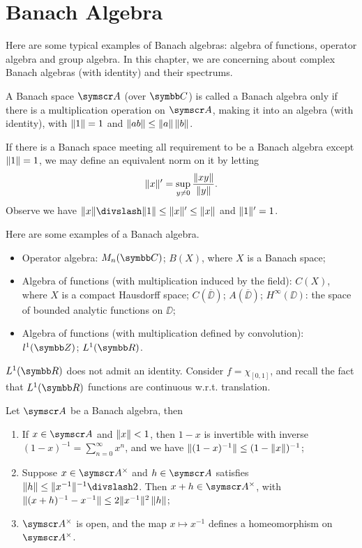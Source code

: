 
\chapter{Banach Algebra}

Here are some typical examples of Banach algebras: algebra of functions, operator algebra and group algebra. In this chapter, we are concerning about complex Banach algebras (with identity) and their spectrums.

\begin{definition}
  A Banach space $\BA{A}$ (over $\CC$) is called a Banach algebra only if there is a multiplication operation on $\BA{A}$, making it into an algebra (with identity), with $\Vert1\Vert=1$ and $\Vert ab\Vert\leq \Vert a\Vert\,\Vert b\Vert$.
\end{definition}

If there is a Banach space meeting all requirement to be a Banach algebra except $\Vert1\Vert=1$, we may define an equivalent norm on it by letting
\begin{equation*}
  \Vert x\Vert'=\sup_{y\neq 0}\frac{\Vert xy\Vert}{\Vert y\Vert}.
\end{equation*}
Observe we have $\NORM{x}\DIV\NORM{1}\leq\NORM{x}'\leq\NORM{x}$ and $\Vert1\Vert'=1$.

Here are some examples of a Banach algebra.

\begin{itemize}
  \item Operator algebra: $M_n(\CC)$; $B(X)$, where $X$ is a Banach space;
  \item Algebra of functions (with multiplication induced by the field): $C(X)$, where $X$ is a compact Hausdorff space; $C(\overline\DD)$; $A(\overline\DD)$; $H^{\infty}(\DD)$: the space of bounded analytic functions on $\DD$;
  \item Algebra of functions (with multiplication defined by convolution): $l^1(\ZZ)$; $L^1(\RR)$.
\end{itemize}

\begin{example}
  $L^1(\RR)$ does not admit an identity. Consider $f = \chi_{[0, 1]}$, and recall the fact that $L^1(\RR)$ functions are continuous w.r.t. translation.
\end{example}

\begin{proposition}
  Let $\BA{A}$ be a Banach algebra, then
  \begin{enumerate}[label=(\arabic*)]
    \item If $x\in \BA{A}$ and $\Vert x\Vert<1$, then $1-x$ is invertible with inverse $(1-x)^{-1}=\sum_{n=0}^\infty x^n$, and we have $\Vert(1-x)^{-1}\Vert\leq (1-\Vert x\Vert)^{-1}$;
    \item Suppose $x\in \BA{A}^\times$ and $h\in \BA{A}$ satisfies $\NORM{h}\leq\NORM{x^{-1}}^{-1}\DIV 2$. Then $x+h\in \BA{A}^{\times}$, with $\Vert(x+h)^{-1}-x^{-1}\Vert\leq 2\Vert x^{-1}\Vert^2\,\Vert h\Vert$;
    \item $\BA{A}^\times$ is open, and the map $x\mapsto x^{-1}$ defines a homeomorphism on $\BA{A}^\times$.
  \end{enumerate}
\end{proposition}

